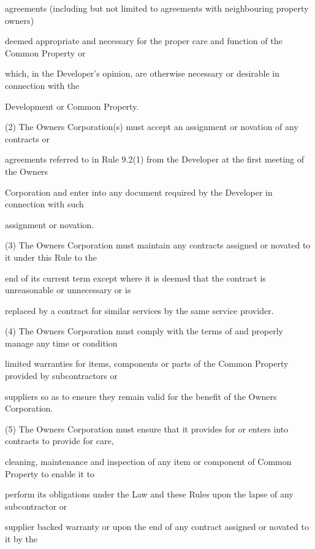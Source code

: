 \documentclass{article}
\begin{document}
{\fontsize{10.02}{1}agreements (including but not limited to agreements with neighbouring property owners) }

{\fontsize{10.02}{1}deemed appropriate and necessary for the proper care and function of the Common Property or }

{\fontsize{10.02}{1}which, in the Developer’s opinion, are otherwise necessary or desirable in connection with the }

{\fontsize{10.02}{1}Development or Common Property. }

{\fontsize{9.962}{1}(2) The Owners Corporation(s) must accept an assignment or novation of any contracts or }

{\fontsize{10.02}{1}agreements referred to in Rule 9.2(1) from the Developer at the first meeting of the Owners }

\newpage

{\fontsize{10.02}{1}Corporation and enter into any document required by the Developer in connection with such }

{\fontsize{10.02}{1}assignment or novation. }

{\fontsize{9.962}{1}(3) The Owners Corporation must maintain any contracts assigned or novated to it under this Rule to the }

{\fontsize{10.02}{1}end of its current term except where it is deemed that the contract is unreasonable or unnecessary or is }

{\fontsize{10.02}{1}replaced by a contract for similar services by the same service provider. }

{\fontsize{9.962}{1}(4) The Owners Corporation must comply with the terms of and properly manage any time or condition }

{\fontsize{10.02}{1}limited warranties for items, components or parts of the Common Property provided by subcontractors or }

{\fontsize{10.02}{1}suppliers so as to ensure they remain valid for the benefit of the Owners Corporation. }

{\fontsize{9.962}{1}(5) The Owners Corporation must ensure that it provides for or enters into contracts to provide for care, }

{\fontsize{10.02}{1}cleaning, maintenance and inspection of any item or component of Common Property to enable it to }

{\fontsize{10.02}{1}perform its obligations under the Law and these Rules upon the lapse of any subcontractor or }

{\fontsize{10.02}{1}supplier backed warranty or upon the end of any contract assigned or novated to it by the }
\end{document}
